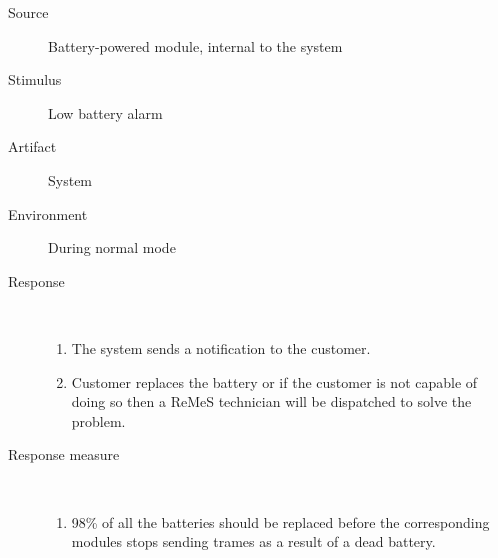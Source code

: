 \begin{description}
	\item[Source] Battery-powered module, internal to the system
	\item[Stimulus] Low battery alarm
	\item[Artifact] System
	\item[Environment] During normal mode 
	\item[Response] \
	\begin{enumerate}
	  \item The system sends a notification to the customer.
	  \item Customer replaces the battery or if the customer is not capable of
	  doing so then a ReMeS technician will be dispatched to solve the problem.
	\end{enumerate}
	\item[Response measure] \
	\begin{enumerate}
	  \item 98\% of all the batteries should be replaced before the corresponding
	  modules stops sending trames as a result of a dead battery.
	\end{enumerate}
\end{description}